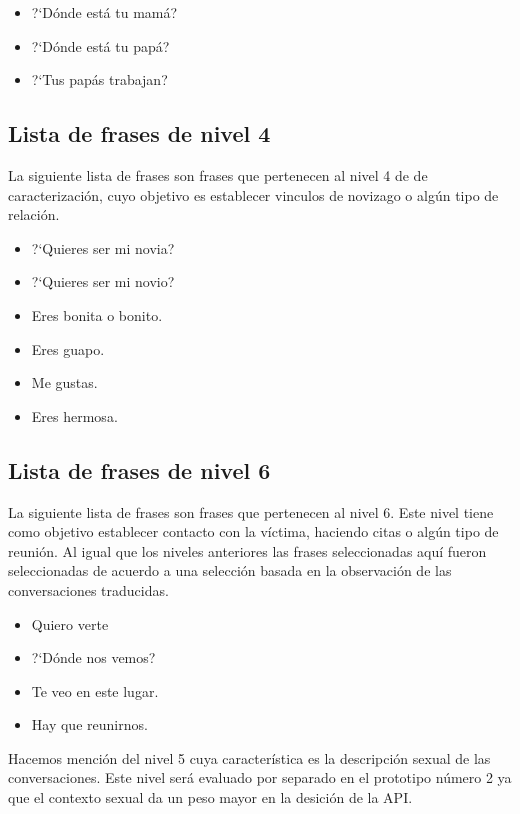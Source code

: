 \begin{itemize}
\item ?`D\'onde est\'a tu mam\'a?
\item ?`D\'onde est\'a tu pap\'a?
\item ?`Tus pap\'as trabajan?
\end{itemize}


\subsection{Lista de frases de nivel 4}
La siguiente lista de frases son frases que pertenecen al nivel 4 de de caracterizaci\'on, cuyo objetivo es establecer vinculos de novizago o alg\'un tipo de relaci\'on. 


\begin{itemize}
\item ?`Quieres ser mi novia?
\item ?`Quieres ser mi novio?
\item Eres bonita o bonito.
\item Eres guapo.
\item Me gustas. 
\item Eres hermosa.
\end{itemize}

\subsection{Lista de frases de nivel 6}
La siguiente lista de frases son frases que pertenecen al nivel 6. Este nivel tiene como objetivo establecer contacto con la v\'ictima, haciendo citas o alg\'un tipo de reuni\'on. Al igual que los niveles anteriores las frases seleccionadas aqu\'i fueron seleccionadas de acuerdo a una selecci\'on basada en la observaci\'on de las conversaciones traducidas.


\begin{itemize}
\item Quiero verte
\item ?`D\'onde nos vemos?
\item Te veo en este lugar.
\item Hay que reunirnos.
\end{itemize}

Hacemos menci\'on del nivel 5 cuya caracter\'istica es la descripci\'on sexual de las conversaciones. Este nivel ser\'a evaluado por separado en el prototipo n\'umero 2 ya que el contexto sexual da un peso mayor en la desici\'on de la API.


